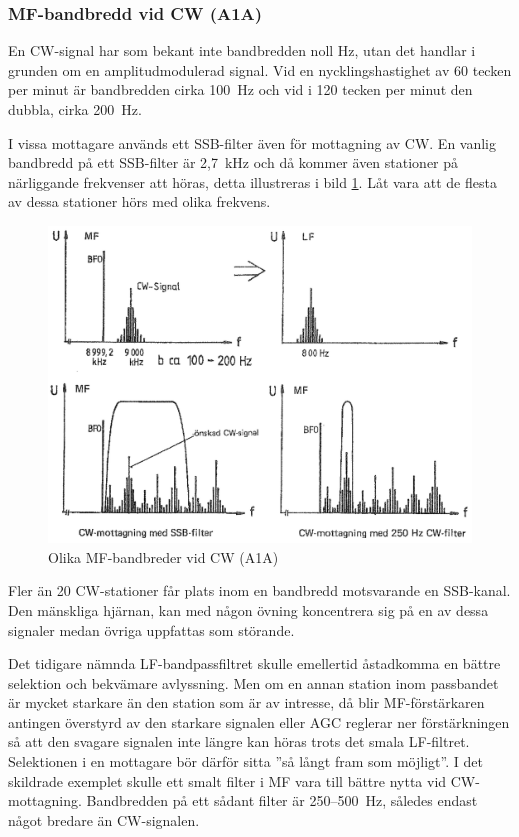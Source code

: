 \subsubsection{MF-bandbredd vid CW (A1A)}

En CW-signal har som bekant inte bandbredden noll Hz, utan det handlar
i grunden om en amplitudmodulerad signal.
Vid en nycklingshastighet av 60 tecken per minut är bandbredden cirka 100~Hz
och vid i 120 tecken per minut den dubbla, cirka 200~Hz.

I vissa mottagare används ett SSB-filter även för mottagning av CW.
En vanlig bandbredd på ett SSB-filter är 2,7~kHz och då kommer även
stationer på närliggande frekvenser att höras, detta illustreras i bild
\ref{fig:bildII4-28}.
Låt vara att de flesta av dessa stationer hörs med olika frekvens.

\begin{figure}
  \includegraphics[width=\textwidth]{images/cropped_pdfs/bild_2_4-28.pdf}
  \caption{Olika MF-bandbreder vid CW (A1A)}
  \label{fig:bildII4-28}
\end{figure}

Fler än 20 CW-stationer får plats inom en bandbredd motsvarande en SSB-kanal.
Den mänskliga hjärnan, kan med någon övning koncentrera sig på en av dessa
signaler medan övriga uppfattas som störande.

Det tidigare nämnda LF-bandpassfiltret skulle emellertid åstadkomma en
bättre selektion och bekvämare avlyssning.
Men om en annan station inom passbandet är mycket starkare än den station
som är av intresse, då blir MF-förstärkaren antingen överstyrd av den
starkare signalen eller AGC reglerar ner förstärkningen så att den svagare
signalen inte längre kan höras trots det smala LF-filtret.
Selektionen i en mottagare bör därför sitta ''så långt fram som möjligt''.
I det skildrade exemplet skulle ett smalt filter i MF vara till bättre nytta
vid CW-mottagning.
Bandbredden på ett sådant filter är 250--500~Hz, således endast något bredare
än CW-signalen.


